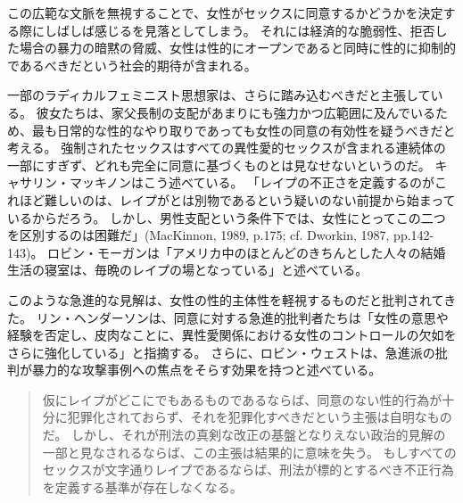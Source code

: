 \documentclass[paper=a4,book,openany]{jlreq}
\newcommand{\ig}[1]{}           %
\begin{document}
この広範な文脈を無視することで、女性がセックスに同意するかどうかを決定する際にしばしば感じるを見落としてしまう。
それには経済的な脆弱性、拒否した場合の暴力の暗黙の脅威、女性は性的にオープンであると同時に性的に抑制的であるべきだという社会的期待が含まれる。

一部のラディカルフェミニスト思想家は、さらに踏み込むべきだと主張している。
彼女たちは、家父長制の支配があまりにも強力かつ広範囲に及んでいるため、最も日常的な性的なやり取りであっても女性の同意の有効性を疑うべきだと考える。
強制されたセックスはすべての異性愛的セックスが含まれる連続体の一部にすぎず、どれも完全に同意に基づくものとは見なせないというのだ。
キャサリン・マッキノン\ig{Catharine MacKinnon}はこう述べている。
「レイプの不正さを定義するのがこれほど難しいのは、レイプがとは別物であるという疑いのない前提から始まっているからだろう。
しかし、男性支配という条件下では、女性にとってこの二つを区別するのは困難だ」(MacKinnon, 1989, p.175; cf. Dworkin, 1987, pp.142-143)。
\nocite{mackinnon89:_towar_femin_theor_of_state}\nocite{dworkin87:_inter}
ロビン・モーガン\ig{Robin Morgan}は「アメリカ中のほとんどのきちんとした人々の結婚生活の寝室は、毎晩のレイプの場となっている」と述べている\citep[pp. 136-137]{morgan80:_theor_and_pract}。

このような急進的な見解は、女性の性的主体性を軽視するものだと批判されてきた。
リン・ヘンダーソン\ig{Lynne Henderson}は、同意に対する急進的批判者たちは「女性の意思や経験を否定し、皮肉なことに、異性愛関係における女性のコントロールの欠如をさらに強化している」と指摘する\citep[p.56]{henderson93:_gettin_know}。
さらに、ロビン・ウェスト\ig{Robin West}は、急進派の批判が暴力的な攻撃事例への焦点をそらす効果を持つと述べている。

\begin{quote}
仮にレイプがどこにでもあるものであるならば、同意のない性的行為が十分に犯罪化されておらず、それを犯罪化すべきだという主張は自明なものだ。
しかし、それが刑法の真剣な改正の基盤となりえない政治的見解の一部と見なされるならば、この主張は結果的に意味を失う。
もしすべてのセックスが文字通りレイプであるならば、刑法が標的とするべき不正行為を定義する基準が存在しなくなる。\citep{west10:_sex_law_consen}
\end{quote}
\end{document}
